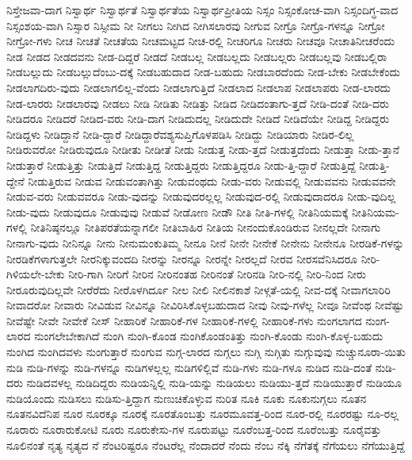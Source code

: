 {ನಿಸ್ತೇಜವಾ-ದಾಗ
ನಿಸ್ವಾರ್ಥ
ನಿಸ್ವಾರ್ಥತೆ
ನಿಸ್ವಾರ್ಥತೆಯ
ನಿಸ್ವಾರ್ಥಪ್ರೀತಿಯ
ನಿಸ್ಸಂ
ನಿಸ್ಸಂಕೋಚ-ವಾಗಿ
ನಿಸ್ಸಂದಿಗ್ಧ-ವಾದ
ನಿಸ್ಸಂಶಯ-ವಾಗಿ
ನಿಸ್ಸಾರ
ನಿಸ್ಸೀಮ
ನೀ
ನೀಗಲು
ನೀಗಿದ
ನೀಗಿಸಲಾರವು
ನೀಗುವ
ನೀಗ್ರೊ
ನೀಗ್ರೊ-ಗಳನ್ನೂ
ನೀಗ್ರೋ
ನೀಗ್ರೋ-ಗಳು
ನೀಚ
ನೀಚತೆ
ನೀಚತೆಯ
ನೀಚಮಟ್ಟದ
ನೀಚ-ರಲ್ಲಿ
ನೀಚರಿಗೂ
ನೀಚರು
ನೀಚವೂ
ನೀಚಾತಿನೀಚರೆಂದು
ನೀಡ
ನೀಡದ
ನೀಡದವನು
ನೀಡ-ದಿದ್ದರೆ
ನೀಡದೆ
ನೀಡಬಲ್ಲ
ನೀಡಬಲ್ಲದು
ನೀಡಬಲ್ಲರು
ನೀಡಬಲ್ಲವು
ನೀಡಬಲ್ಲಿರಾ
ನೀಡಬಲ್ಲುದು
ನೀಡಬಲ್ಲುದೆಂಬು-ದಕ್ಕೆ
ನೀಡಬಹುದಾದ
ನೀಡ-ಬಹುದು
ನೀಡಬಾರದೆಂದು
ನೀಡ-ಬೇಕು
ನೀಡಬೇಕೆಂದು
ನೀಡಲಾಗದಿರು-ವುದು
ನೀಡಲಾಗಲಿಲ್ಲ-ವೆಂದು
ನೀಡಲಾಗುತ್ತಿದೆ
ನೀಡಲಾದ
ನೀಡಲಾಪ
ನೀಡಲಾಪರು
ನೀಡ-ಲಾರದು
ನೀಡ-ಲಾರರು
ನೀಡಲಾರವು
ನೀಡಲು
ನೀಡಿ
ನೀಡಿತು
ನೀಡಿತ್ತು
ನೀಡಿದ
ನೀಡಿದಂತಾಗು-ತ್ತದೆ
ನೀಡಿ-ದಂತೆ
ನೀಡಿ-ದರು
ನೀಡಿದರೂ
ನೀಡಿದರೆ
ನೀಡಿದ-ವರು
ನೀಡಿ-ದಾಗ
ನೀಡಿದುದಲ್ಲ
ನೀಡಿದುದೇ
ನೀಡಿದೆ
ನೀಡಿದೆಯೇ
ನೀಡಿದ್ದ
ನೀಡಿದ್ದರು
ನೀಡಿದ್ದಳು
ನೀಡಿದ್ದಾನೆ
ನೀಡಿ-ದ್ದಾರೆ
ನೀಡಿದ್ದಾರೆವಶ್ಯಸುಪ್ತಿಗೊಳಪಡಿಸಿ
ನೀಡಿದ್ದು
ನೀಡಿಯಾರು
ನೀಡಿರ-ಲಿಲ್ಲ
ನೀಡಿರುವರೋ
ನೀಡಿರುವುದೂ
ನೀಡೀತು
ನೀಡೀತೆ
ನೀಡು
ನೀಡುತ್ತ
ನೀಡು-ತ್ತದೆ
ನೀಡುತ್ತದೆಂದು
ನೀಡುತ್ತಾ
ನೀಡು-ತ್ತಾನೆ
ನೀಡುತ್ತಾರೆ
ನೀಡುತ್ತಿತ್ತು
ನೀಡುತ್ತಿದೆ
ನೀಡುತ್ತಿದ್ದ
ನೀಡುತ್ತಿದ್ದರು
ನೀಡುತ್ತಿದ್ದರೂ
ನೀಡು-ತ್ತಿ-ದ್ದಾರೆ
ನೀಡುತ್ತಿದ್ದೆ
ನೀಡುತ್ತಿ-ದ್ದೇನೆ
ನೀಡುತ್ತಿರುವ
ನೀಡುವ
ನೀಡುವಂತಾಗಿತ್ತು
ನೀಡುವಂಥದು
ನೀಡು-ವರು
ನೀಡುವಲ್ಲಿ
ನೀಡುವವನು
ನೀಡುವವನೇ
ನೀಡುವ-ವರು
ನೀಡುವವರೂ
ನೀಡು-ವುದನ್ನು
ನೀಡುವುದರಲ್ಲಲ್ಲ
ನೀಡುವುದ-ರಲ್ಲಿ
ನೀಡುವುದಾದರೂ
ನೀಡು-ವುದಿಲ್ಲ
ನೀಡು-ವುದು
ನೀಡುವುದೂ
ನೀಡುವುವು
ನೀಡುವೆ
ನೀಡೋಣ
ನೀಡೌ
ನೀತಿ
ನೀತಿ-ಗಳಲ್ಲಿ
ನೀತಿನಿಯಮಕ್ಕೆ
ನೀತಿನಿಯಮ-ಗಳಲ್ಲಿ
ನೀತಿನಿಷ್ಠನಲ್ಲೂ
ನೀತಿಪರತೆಯನ್ನಾಗಲೀ
ನೀತಿಬಾಹಿರ
ನೀತಿಯ
ನೀನಂದುಕೊಂಡಿರುವ
ನೀನಲ್ಲದೇ
ನೀನಾಗು
ನೀನಾಗು-ವುದು
ನೀನಿನ್ನೂ
ನೀನು
ನೀನುಮಂಕುತಿಮ್ಮ
ನೀನೂ
ನೀನೆ
ನೀನೇ
ನೀನೇಕೆ
ನೀನೇನು
ನೀನೇನೂ
ನೀರಡಿಕೆ-ಗಳನ್ನು
ನೀರಡಿಕೆಗಳಾಗುತ್ತಲೇ
ನೀರನಿಕ್ಕುವಂದದಿ
ನೀರನ್ನು
ನೀರನ್ನೂ
ನೀರನ್ನೇ
ನೀರಲ್ಲದೆ
ನೀರವ
ನೀರಸವೆನಿಸಿದರೂ
ನೀರಿ-ಗಿಳಿಯಲೇ-ಬೇಕು
ನೀರಿ-ಗಾಗಿ
ನೀರಿಗೆ
ನೀರಿನ
ನೀರಿನಂತಹ
ನೀರಿನಂತೆ
ನೀರಿನಡಿ
ನೀರಿ-ನಲ್ಲಿ
ನೀರಿ-ನಿಂದ
ನೀರು
ನೀರೂರುವುದಿಲ್ಲವೇ
ನೀರೆರೆದು
ನೀರೊಳಗಿರ್ದೂ
ನೀಲ
ನೀಲಿ
ನೀಲಿನಕಾಶೆ
ನೀಳ್ಗತೆ-ಯಲ್ಲಿ
ನೀವ-ದಕ್ಕೆ
ನೀವಾಗಲಾರಿರಿ
ನೀವಾದರೋ
ನೀವಾರು
ನೀವಿಡುವ
ನೀವಿನ್ನೂ
ನೀವಿರಿಸಿಕೊಳ್ಳಬಹುದಾದ
ನೀವು
ನೀವು-ಗಳೆಲ್ಲ
ನೀವೂ
ನೀವೆಂಥ
ನೀವೆಷ್ಟು
ನೀವೆಷ್ಟೇ
ನೀವೇ
ನೀವೇಕೆ
ನೀಸ್
ನೀಹಾರಿಕೆ
ನೀಹಾರಿಕೆ-ಗಳ
ನೀಹಾರಿಕೆ-ಗಳಲ್ಲಿ
ನೀಹಾರಿಕೆ-ಗಳು
ನುಂಗಲಾಗದ
ನುಂಗ-ಲಾರದ
ನುಂಗಲೇಬೇಕಾಗಿದೆ
ನುಂಗಿ
ನುಂಗಿ-ಕೊಂಡ
ನುಂಗಿಕೊಂಡಂತಿತ್ತು
ನುಂಗಿ-ಕೊಂಡು
ನುಂಗಿ-ಕೊಳ್ಳ-ಬಹುದು
ನುಂಗಿದ
ನುಂಗಿದವಳು
ನುಂಗುತ್ತಾರೆ
ನುಂಗುವ
ನುಗ್ಗ-ಲಾರದ
ನುಗ್ಗಲು
ನುಗ್ಗಿ
ನುಗ್ಗಿತು
ನುಗ್ಗುವುವು
ನುಚ್ಚುನೂರಾ-ಯಿತು
ನುಡಿ
ನುಡಿ-ಗಳನ್ನು
ನುಡಿ-ಗಳನ್ನೂ
ನುಡಿಗಳಲ್ಲಲ್ಲ
ನುಡಿಗಳಿಲ್ಲಿವೆ
ನುಡಿ-ಗಳು
ನುಡಿ-ಗಳೂ
ನುಡಿದ
ನುಡಿ-ದಂತೆ
ನುಡಿ-ದರು
ನುಡಿದವಳಲ್ಲ
ನುಡಿದಿದ್ದರು
ನುಡಿಯನ್ನಿಲ್ಲಿ
ನುಡಿ-ಯನ್ನು
ನುಡಿಯಲು
ನುಡಿಯು-ತ್ತದೆ
ನುಡಿಯುತ್ತಾರೆ
ನುಡಿಯೂ
ನುಡಿಯೊಂದು
ನುಡಿಸಲು
ನುಡಿಸು-ತ್ತಿದ್ದಾಗ
ನುಣುಚಿಕೊಳ್ಳುವ
ನುರಿತ
ನೂಕಿ
ನೂಕು
ನೂಕುನುಗ್ಗಲು
ನೂತನ
ನೂತನವಿದೆನಿಪ
ನೂರ
ನೂರಕ್ಕೂ
ನೂರಕ್ಕೆ
ನೂರತೊಂಬತ್ತು
ನೂರಮೂವತ್ತ-ರಿಂದ
ನೂರ-ರಲ್ಲಿ
ನೂರರಷ್ಟು
ನೂ-ರಲ್ಲ
ನೂರಾರು
ನೂರಾರುಕೋಟಿ
ನೂರು
ನೂರುಕೇಸು-ಗಳ
ನೂರುಪಟ್ಟು
ನೂರೆಂಬತ್ತ-ರಿಂದ
ನೂರೆಂಬತ್ತು
ನೂರೈವತ್ತು
ನೂಲಿನಂತೆ
ನೃತ್ಯ
ನೃತ್ಯದ
ನೆ
ನೆಂಟರಿಷ್ಟರೂ
ನೆಂಟರೆಲ್ಲ
ನೆಂದಾದರೆ
ನೆಂದು
ನೆಂಬ
ನೆಕ್ಕಿ
ನೆಗೆತಕ್ಕೆ
ನೆಗೆಯಲು
ನೆಗೆಯುತ್ತಿದ್ದೆ
}
